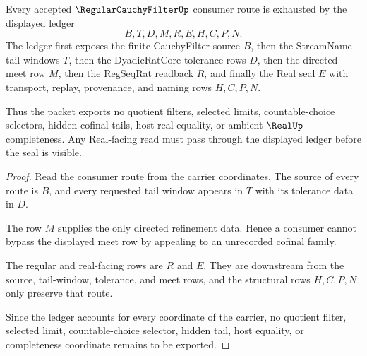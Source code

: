 \begin{theorem}
\label{thm:regularcauchyfilter-ledger}
Every accepted $\RegularCauchyFilterUp$ consumer route is exhausted by the displayed ledger
$$
B,T,D,M,R,E,H,C,P,N .
$$
The ledger first exposes the finite CauchyFilter source $B$, then the StreamName tail windows $T$, then the DyadicRatCore tolerance rows $D$, then the directed meet row $M$, then the RegSeqRat readback $R$, and finally the Real seal $E$ with transport, replay, provenance, and naming rows $H,C,P,N$.

Thus the packet exports no quotient filters, selected limits, countable-choice selectors, hidden cofinal tails, host real equality, or ambient $\RealUp$ completeness. Any Real-facing read must pass through the displayed ledger before the seal is visible.
\end{theorem}
\begin{proof}
Read the consumer route from the carrier coordinates. The source of every route is $B$, and every requested tail window appears in $T$ with its tolerance data in $D$.

The row $M$ supplies the only directed refinement data. Hence a consumer cannot bypass the displayed meet row by appealing to an unrecorded cofinal family.

The regular and real-facing rows are $R$ and $E$. They are downstream from the source, tail-window, tolerance, and meet rows, and the structural rows $H,C,P,N$ only preserve that route.

Since the ledger accounts for every coordinate of the carrier, no quotient filter, selected limit, countable-choice selector, hidden tail, host equality, or completeness coordinate remains to be exported.
\end{proof}

